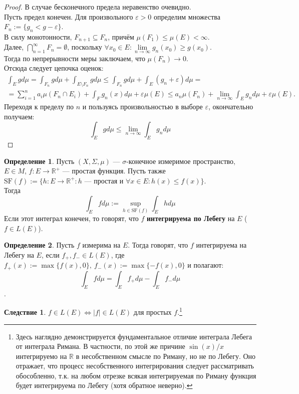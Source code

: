 \documentclass[11pt,a4paper]{report}
\def\eps{\varepsilon}
\def\Real{\mathbb{R}}
\theoremstyle{definition}
\theoremstyle{definition}
\newtheorem{corollary}{Следствие}[section]
\theoremstyle{definition}
\newtheorem{definition}{Определение}[section]
\begin{document}
		\begin{proof}
			В случае бесконечного предела неравенство очевидно.\\
			Пусть предел конечен. Для произвольного $ \eps > 0 $ определим множества $ F_{n} := \{ g_{n} < g - \eps \} $.\\
			В силу монотонности, $ F_{n+1} \subseteq F_{n}  $, причём $ \mu(F_{1}) \le \mu(E) < \infty $.\\ 
			Далее, $ \bigcap\limits_{n=1}^{\infty} F_{n} = \emptyset $, поскольку $ \forall x_{0} \in E: \lim\limits_{n \to \infty} g_{n}(x_{0}) \ge g(x_{0}) $.\\
			Тогда по непрерывности меры заключаем, что $ \mu(F_{n}) \to 0 $.\\
			Отсюда следует цепочка оценок:
			\begin{gather*}
				\int_{E} g d\mu = \int_{F_{n}} g d\mu + \int_{E \setminus F_{n}} g d\mu \le \int_{F_{n}} g d\mu + \int_{E} (g_{n} + \eps) d\mu =\\= \sum\limits_{i=1}^{n} a_{i} \mu(F_{n} \cap E_{i}) + \int_{F} g_{n}(x) d\mu + \eps \mu(E) \le a_{n} \mu(F_{n}) + \lim\limits_{n\to\infty}\int_{E} g_{n} d\mu + \eps \mu(E).
			\end{gather*}
			Переходя к пределу по $ n $ и пользуясь произвольностью в выборе $ \eps $, окончательно получаем:
			\[ \int_{E} g d\mu \le \lim\limits_{n\to\infty}\int_{E} g_{n} d\mu \]
		\end{proof}
		\begin{definition}
			Пусть $ (X, \Sigma, \mu) $ — $ \sigma $-конечное измеримое пространство, $ E \in M $, $ f: E \to \Real^{+} $ — простая функция. Пусть также $ \mbox{SF}(f) := \{h: E \to \Real^{+}:  h\text{ — простая и } \forall x \in E: h(x) \le f(x) \} $.\\
			Тогда \[ \int_{E} f d\mu := \sup\limits_{h \in \mbox{SF}(f)} \int_{E} h d\mu \]
			Если этот интеграл конечен, то говорят, что $ f $ \textbf{интегрируема по Лебегу} на $ E $ ($ f \in L(E)$).
		\end{definition}
		\begin{definition}
			Пусть $ f $ измерима на $ E $. Тогда говорят, что $ f $ интегрируема на Лебегу на $ E $, если $ f_{+}, f_{-} \in L(E) $, где $ f_{+}(x) := \max \{f(x), 0\},\ f_{-}(x) := \max \{-f(x), 0\} $ и полагают: 
			\[ \int_{E} f d\mu = \int_{E} f_{+}d\mu - \int_{E} f_{-} d\mu \].
		\end{definition}
		\begin{corollary}
			$ f \in L(E) \iff |f| \in L(E) $ для простых $ f $.\footnote{Здесь наглядно демонстрируется фундаментальное отличие интеграла Лебега от интеграла Римана. В частности, по этой же причине $ \sin(x)/x $ интегрируемо на $ \Real $ в несобственном смысле по Риману, но не по Лебегу. Оно отражает, что процесс несобственного интегрирования следует рассматривать обособленно, т.к. на любом отрезке всякая интегрируемая по Риману функция будет интегрируема по Лебегу (хотя обратное неверно).}
		\end{corollary}
\end{document}
